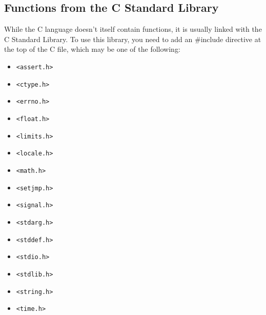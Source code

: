 \subsection{Functions from the C Standard Library}
While the C language doesn't itself contain functions, it is usually linked
with the C Standard Library. To use this library, you need to add an \#include
directive at the top of the C file, which may be one of the following:
\begin{itemize}
\setlength{\itemsep}{0cm}
\setlength{\parskip}{0cm}
\item \texttt{\textless{}assert.h\textgreater{}}
\item \texttt{\textless{}ctype.h\textgreater{}}
\item \texttt{\textless{}errno.h\textgreater{}}
\item \texttt{\textless{}float.h\textgreater{}}
\end{itemize}
\begin{itemize}
\setlength{\itemsep}{0cm}
\setlength{\parskip}{0cm}
\item \texttt{\textless{}limits.h\textgreater{}}
\item \texttt{\textless{}locale.h\textgreater{}}
\item \texttt{\textless{}math.h\textgreater{}}
\item \texttt{\textless{}setjmp.h\textgreater{}}
\end{itemize}
\begin{itemize}
\setlength{\itemsep}{0cm}
\setlength{\parskip}{0cm}
\item \texttt{\textless{}signal.h\textgreater{}}
\item \texttt{\textless{}stdarg.h\textgreater{}}
\item \texttt{\textless{}stddef.h\textgreater{}}
\item \texttt{\textless{}stdio.h\textgreater{}}
\end{itemize}
\begin{itemize}
\setlength{\itemsep}{0cm}
\setlength{\parskip}{0cm}
\item \texttt{\textless{}stdlib.h\textgreater{}}
\item \texttt{\textless{}string.h\textgreater{}}
\item \texttt{\textless{}time.h\textgreater{}}
\end{itemize}

